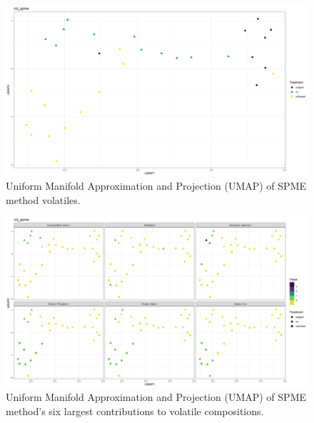 \documentclass[12pt,final,CPage]{ufthesis}
\begin{document}
{\begin{figure}
  {\centering \includegraphics[width=1\linewidth]{figure/rrv_volatiles_umap_rrd_spme} 

  }

  \caption{Uniform Manifold Approximation and Projection (UMAP) of SPME method volatiles.}\label{fig:spme-vocs-umap}
  \end{figure}
  \begin{figure}

  {\centering \includegraphics[width=1\linewidth]{figure/rrv_volatiles_umap_chems_rrd_spme} 

  }

  \caption{Uniform Manifold Approximation and Projection (UMAP) of SPME method's six largest contributions to volatile compositions.}\label{fig:spme-vocs-umap-chems}
  \end{figure}
  \begin{table}


\end{table}}
\end{document}
